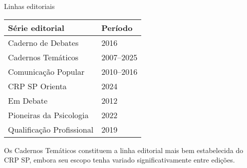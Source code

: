 \documentclass{beamer}
\begin{document}
\begin{frame}{Linhas editoriais}
	\begin{tabular}{l l}
        \toprule
        \textbf{Série editorial} & \textbf{Período} \\
        \midrule
		Caderno de Debates & 2016 \\
        Cadernos Temáticos & 2007–2025 \\
        Comunicação Popular & 2010–2016 \\
		CRP SP Orienta & 2024 \\
		Em Debate & 2012 \\
        Pioneiras da Psicologia & 2022 \\
        Qualificação Profissional & 2019 \\
        \bottomrule
    \end{tabular}

	Os \alert{Cadernos Temáticos} constituem a linha editorial mais bem estabelecida do CRP SP, embora seu escopo tenha variado significativamente entre edições.
\end{frame}
\end{document}
